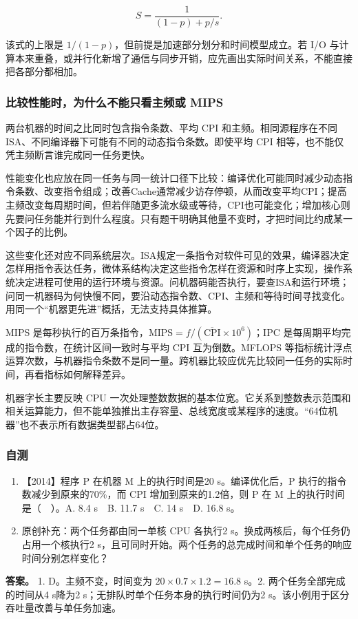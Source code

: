 \[
S=\frac{1}{(1-p)+p/s}.
\]

该式的上限是 \(1/(1-p)\)，但前提是加速部分划分和时间模型成立。若 I/O 与计算本来重叠，或并行化新增了通信与同步开销，应先画出实际时间关系，不能直接把各部分都相加。

\subsubsection{比较性能时，为什么不能只看主频或 MIPS}\label{ux6bd4ux8f83ux6027ux80fdux65f6ux4e3aux4ec0ux4e48ux4e0dux80fdux53eaux770bux4e3bux9891ux6216-mips}

两台机器的时间之比同时包含指令条数、平均 CPI 和主频。相同源程序在不同 ISA、不同编译器下可能有不同的动态指令条数。即使平均 CPI 相等，也不能仅凭主频断言谁完成同一任务更快。

性能变化也应放在同一任务与同一统计口径下比较：编译优化可能同时减少动态指令条数、改变指令组成；改善Cache通常减少访存停顿，从而改变平均CPI；提高主频改变每周期时间，但若伴随更多流水级或等待，CPI也可能变化；增加核心则先要问任务能并行到什么程度。只有题干明确其他量不变时，才把时间比约成某一个因子的比例。

这些变化还对应不同系统层次。ISA规定一条指令对软件可见的效果，编译器决定怎样用指令表达任务，微体系结构决定这些指令怎样在资源和时序上实现，操作系统决定进程可使用的运行环境与资源。问机器码能否执行，要查ISA和运行环境；问同一机器码为何快慢不同，要沿动态指令数、CPI、主频和等待时间寻找变化。用同一个``机器更先进''概括，无法支持具体推算。

MIPS 是每秒执行的百万条指令，\(\mathrm{MIPS}=f/(\overline{\mathrm{CPI}}\times10^6)\)；IPC 是每周期平均完成的指令数，在统计区间一致时与平均 CPI 互为倒数。MFLOPS 等指标统计浮点运算次数，与机器指令条数不是同一量。跨机器比较应优先比较同一任务的实际时间，再看指标如何解释差异。

机器字长主要反映 CPU 一次处理整数数据的基本位宽。它关系到整数表示范围和相关运算能力，但不能单独推出主存容量、总线宽度或某程序的速度。``64位机器''也不表示所有数据类型都占64位。

\subsubsection{自测}\label{co-self1}

\begin{enumerate}
\def\labelenumi{\arabic{enumi}.}
\tightlist
\item
  【2014】程序 P 在机器 M 上的执行时间是20 s。编译优化后，P 执行的指令数减少到原来的70\%，而 CPI 增加到原来的1.2倍，则 P 在 M 上的执行时间是（　）。A. 8.4 s　B. 11.7 s　C. 14 s　D. 16.8 s。
\item
  原创补充：两个任务都由同一单核 CPU 各执行2 s。换成两核后，每个任务仍占用一个核执行2 s，且可同时开始。两个任务的总完成时间和单个任务的响应时间分别怎样变化？
\end{enumerate}

\textbf{答案。} 1. D。主频不变，时间变为 \(20\times0.7\times1.2=16.8\) s。2. 两个任务全部完成的时间从4 s降为2 s；无排队时单个任务本身的执行时间仍为2 s。该小例用于区分吞吐量改善与单任务加速。
